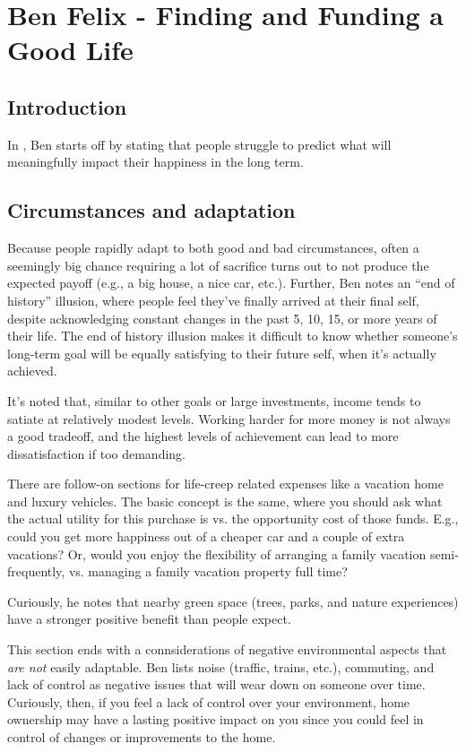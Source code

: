 \documentclass{article}
\begin{document}
\section{Ben Felix - Finding and Funding a Good Life}

\subsection{Introduction}
In \cite{Felix2026}, Ben starts off by stating that people struggle to predict what will meaningfully impact their happiness in the long term. 


\subsection{Circumstances and adaptation}
Because people rapidly adapt to both good and bad circumstances, often a seemingly big chance requiring a lot of sacrifice turns out to not produce the expected payoff (e.g., a big house, a nice car, etc.).  Further, Ben notes an ``end of history'' illusion, where people feel they've finally arrived at their final self, despite acknowledging constant changes in the past 5, 10, 15, or more years of their life.  The end of history illusion makes it difficult to know whether someone's long-term goal will be equally satisfying to their future self, when it's actually achieved.

It's noted that, similar to other goals or large investments, income tends to satiate at relatively modest levels.  Working harder for more money is not always a good tradeoff, and the highest levels of achievement can lead to more dissatisfaction if too demanding.

There are follow-on sections for life-creep related expenses like a vacation home and luxury vehicles.  The basic concept is the same, where you should ask what the actual utility for this purchase is vs. the opportunity cost of those funds.  E.g., could you get more happiness out of a cheaper car and a couple of extra vacations?  Or, would you enjoy the flexibility of arranging a family vacation semi-frequently, vs. managing a family vacation property full time?

Curiously, he notes that nearby green space (trees, parks, and nature experiences) have a stronger positive benefit than people expect.

This section ends with a connsiderations of negative environmental aspects that {\it are not} easily adaptable.  Ben lists noise (traffic, trains, etc.), commuting, and lack of control as negative issues that will wear down on someone over time.  Curiously, then, if you feel a lack of control over your environment, home ownership may have a lasting positive impact on you since you could feel in control of changes or improvements to the home.
\end{document}
